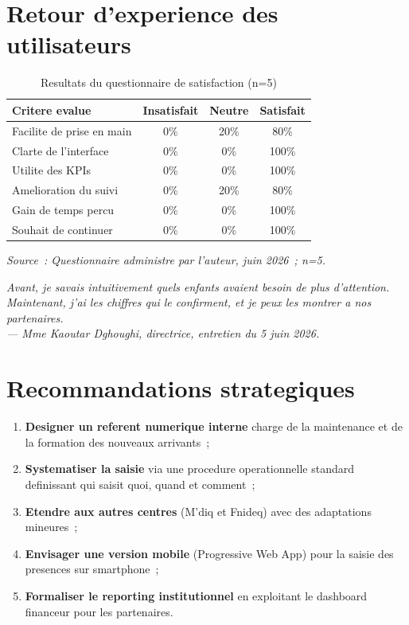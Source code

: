 \documentclass[12pt,a4paper,openany]{report}
\begin{document}
\section{Retour d'experience des utilisateurs}

\begin{table}[H]
\centering
\caption{Resultats du questionnaire de satisfaction (n=5)}
\label{tab:satisfaction}
\begin{tabularx}{\textwidth}{Xccc}
\toprule
\textbf{Critere evalue} & \textbf{Insatisfait} & \textbf{Neutre} & \textbf{Satisfait}\\
\midrule
Facilite de prise en main & 0\% & 20\% & 80\%\\
Clarte de l'interface & 0\% & 0\% & 100\%\\
Utilite des KPIs & 0\% & 0\% & 100\%\\
Amelioration du suivi & 0\% & 20\% & 80\%\\
Gain de temps percu & 0\% & 0\% & 100\%\\
Souhait de continuer & 0\% & 0\% & 100\%\\
\bottomrule
\end{tabularx}
\vspace{0.1cm}
\small\textit{Source~: Questionnaire administre par l'auteur, juin 2026~; n=5.}
\end{table}

\begin{boitecitation}
\itshape
\og{}Avant, je savais intuitivement quels enfants avaient besoin de plus
d'attention. Maintenant, j'ai les chiffres qui le confirment, et je peux
les montrer a nos partenaires.\fg{}\\
\raggedleft --- Mme Kaoutar Dghoughi, directrice, entretien du 5 juin 2026.
\end{boitecitation}

\section{Recommandations strategiques}

\begin{enumerate}
  \item \textbf{Designer un referent numerique interne} charge de la
    maintenance et de la formation des nouveaux arrivants~;
  \item \textbf{Systematiser la saisie} via une procedure operationnelle
    standard definissant qui saisit quoi, quand et comment~;
  \item \textbf{Etendre aux autres centres} (M'diq et Fnideq) avec des
    adaptations mineures~;
  \item \textbf{Envisager une version mobile} (Progressive Web App) pour
    la saisie des presences sur smartphone~;
  \item \textbf{Formaliser le reporting institutionnel} en exploitant le
    dashboard financeur pour les partenaires.
\end{enumerate}
\end{document}
